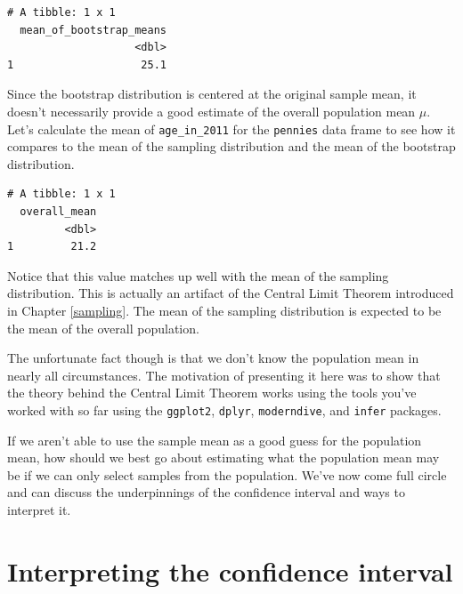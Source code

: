 \documentclass[12pt,]{krantz}
\makeatletter
\newenvironment{Shaded}{\begin{snugshade}}{\end{snugshade}}
\newcommand{\KeywordTok}[1]{\textcolor[rgb]{0.27,0.27,0.27}{\textbf{#1}}}
\newcommand{\DataTypeTok}[1]{\textcolor[rgb]{0.27,0.27,0.27}{#1}}
\newcommand{\DecValTok}[1]{\textcolor[rgb]{0.06,0.06,0.06}{#1}}
\newcommand{\StringTok}[1]{\textcolor[rgb]{0.5,0.5,0.5}{#1}}
\newcommand{\OperatorTok}[1]{\textcolor[rgb]{0.43,0.43,0.43}{\textbf{#1}}}
\newcommand{\NormalTok}[1]{#1}
\newenvironment{kframe}{%
\medskip{}
\setlength{\fboxsep}{.8em}
 \def\at@end@of@kframe{}%
 \ifinner\ifhmode%
  \def\at@end@of@kframe{\end{minipage}}%
  \begin{minipage}{\columnwidth}%
 \fi\fi%
 \def\FrameCommand##1{\hskip\@totalleftmargin \hskip-\fboxsep
 \colorbox{shadecolor}{##1}\hskip-\fboxsep
     \hskip-\linewidth \hskip-\@totalleftmargin \hskip\columnwidth}%
 \MakeFramed {\advance\hsize-\width
   \@totalleftmargin\z@ \linewidth\hsize
   \@setminipage}}%
 {\par\unskip\endMakeFramed%
 \at@end@of@kframe}
\renewenvironment{Shaded}{\begin{kframe}}{\end{kframe}}
\theoremstyle{definition}
\theoremstyle{definition}
\theoremstyle{definition}
\theoremstyle{remark}
\makeatother
\begin{document}
\begin{verbatim}
# A tibble: 1 x 1
  mean_of_bootstrap_means
                    <dbl>
1                    25.1
\end{verbatim}

Since the bootstrap distribution is centered at the original sample
mean, it doesn't necessarily provide a good estimate of the overall
population mean \(\mu\). Let's calculate the mean of
\texttt{age\_in\_2011} for the \texttt{pennies} data frame to see how it
compares to the mean of the sampling distribution and the mean of the
bootstrap distribution.

\begin{Shaded}
\end{Shaded}

\begin{verbatim}
# A tibble: 1 x 1
  overall_mean
         <dbl>
1         21.2
\end{verbatim}

Notice that this value matches up well with the mean of the sampling
distribution. This is actually an artifact of the Central Limit Theorem
introduced in Chapter \ref{sampling}. The mean of the sampling
distribution is expected to be the mean of the overall population.

The unfortunate fact though is that we don't know the population mean in
nearly all circumstances. The motivation of presenting it here was to
show that the theory behind the Central Limit Theorem works using the
tools you've worked with so far using the \texttt{ggplot2},
\texttt{dplyr}, \texttt{moderndive}, and \texttt{infer} packages.

If we aren't able to use the sample mean as a good guess for the
population mean, how should we best go about estimating what the
population mean may be if we can only select samples from the
population. We've now come full circle and can discuss the underpinnings
of the confidence interval and ways to interpret it.

\section{Interpreting the confidence
interval}\label{interpreting-the-confidence-interval}
\end{document}
